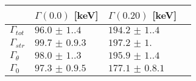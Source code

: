 \begin{tabular}{llll} \hline
\toprule 
 & $\Gamma(0.0)$ [keV]  &  $\Gamma(0.20)$ [keV]  \\ \midrule 
$\Gamma_{tot}$ & $\num{96.0(1.4)}$ & $\num{194.2(1.4)}$\\ 
$\Gamma_{str}$ & $\num{99.7(0.93)}$ & $\num{197.2(1.0)}$\\ 
$\Gamma_{\theta}$ & $\num{98.0(1.3)}$ & $\num{195.9(1.4)}$\\ 
$\Gamma_{0}$ & $\num{97.3(0.95)}$ & $\num{177.1(0.81)}$\\ 
 \bottomrule 
\end{tabular}
